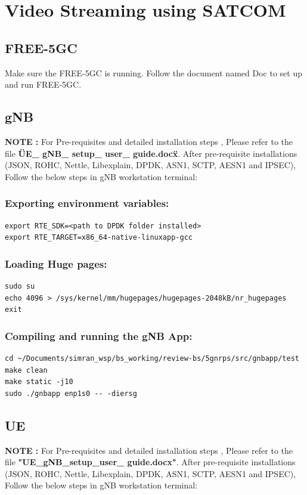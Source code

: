 \section{Video Streaming using SATCOM} 
\subsection{FREE-5GC}
Make sure the FREE-5GC is running. Follow the document named Doc to set up and run FREE-5GC.
\subsection{gNB}
\textbf{NOTE :} For Pre-requisites and detailed installation steps , Please refer to the file \textbf{\"UE\_ gNB\_ setup\_ user\_ guide.docx\"}.
After pre-requisite installations (JSON, ROHC, Nettle, Libexplain, DPDK, ASN1, SCTP, AESN1 and IPSEC), Follow the below steps in gNB workstation terminal:

\subsubsection{Exporting environment variables:}

\begin{lstlisting}
export RTE_SDK=<path to DPDK folder installed>
export RTE_TARGET=x86_64-native-linuxapp-gcc
\end{lstlisting}

\subsubsection{Loading Huge pages:}
\begin{lstlisting}
sudo su
echo 4096 > /sys/kernel/mm/hugepages/hugepages-2048kB/nr_hugepages
exit
\end{lstlisting}

\subsubsection{Compiling and running the gNB App:}
\begin{lstlisting}
cd ~/Documents/simran_wsp/bs_working/review-bs/5gnrps/src/gnbapp/test
make clean
make static -j10
sudo ./gnbapp enp1s0 -- -diersg
\end{lstlisting}

\subsection{UE}
\textbf{NOTE :} For Pre-requisites and detailed installation steps , Please refer to the file \textbf{"UE\_gNB\_setup\_user\_ guide.docx"}.
After pre-requisite installations (JSON, ROHC, Nettle, Libexplain, DPDK, ASN1, SCTP, AESN1 and IPSEC), Follow the below steps in gNB workstation terminal:

